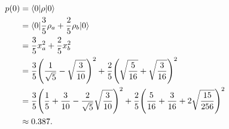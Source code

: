\documentclass[10pt]{article}
\begin{document}
\begin{align*}
p(0) &=  \braket{ 0 | \rho | 0} \\
       &= \braket{ 0 | \frac{3}{5} \rho_a + \frac{2}{5} \rho_b | 0 }\\
       &= \frac{3}{5} x_a^2 + \frac{2}{5} x_b^2 \\
       &= \frac{3}{5} \Bigg( \frac{1}{\sqrt{5}} - \sqrt{\frac{3}{10}} \Bigg)^2 + \frac{2}{5} \Bigg( \sqrt{\frac{5}{16}} + \sqrt{\frac{3}{16}} \Bigg)^2 \\
       &= \frac{3}{5} \Bigg( \frac{1}{5} + \frac{3}{10} - \frac{2}{\sqrt{5}} \sqrt{\frac{3}{10}} \Bigg)^2 + \frac{2}{5} \Bigg( \frac{5}{16} + \frac{3}{16} + 2\sqrt{\frac{15}{256}} \Bigg)^2 \\
       &\approx 0.387.
\end{align*}
\end{document}
